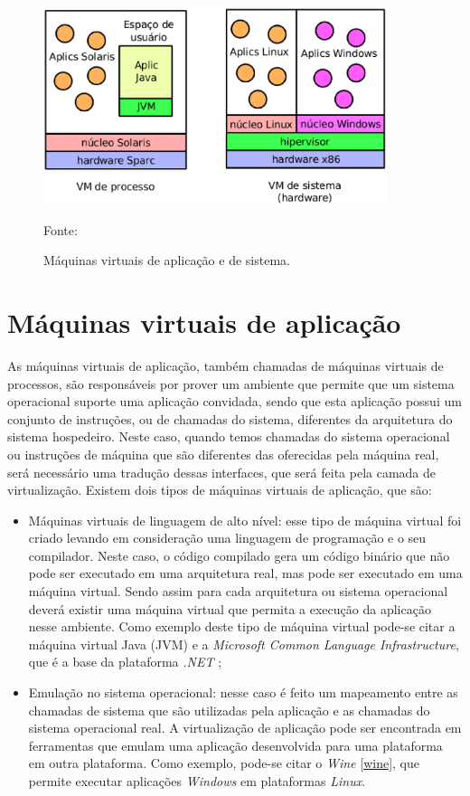\begin{figure}[vms_tipos]
 \centering
 \includegraphics[width=380px]{img/vms_tipos.eps}
 \caption{Máquinas virtuais de aplicação e de sistema.}
 \label{fig:vms_tipos}
 Fonte: \citet{laureano2008}
\end{figure}

\section{Máquinas virtuais de aplicação}
\label{section:virtaplicacao}

As máquinas virtuais de aplicação, também chamadas de máquinas virtuais de processos, são responsáveis por prover um ambiente que permite 
que um sistema operacional suporte uma aplicação convidada, sendo que esta aplicação possui um conjunto de instruções, ou de chamadas
do sistema, diferentes da arquitetura do sistema hospedeiro. Neste caso, quando temos chamadas do sistema operacional ou instruções de máquina 
que são diferentes das oferecidas pela máquina real, será necessário uma tradução dessas interfaces, que será feita pela camada de 
virtualização. Existem dois tipos de máquinas virtuais de aplicação, que são:

\begin{itemize}
 \item Máquinas virtuais de linguagem de alto nível: esse tipo de máquina virtual foi criado levando em consideração uma linguagem de 
 programação e o seu compilador. Neste caso, o código compilado gera um código binário que não pode ser executado em uma arquitetura real, 
 mas pode ser executado em uma máquina virtual. Sendo assim para cada arquitetura ou sistema operacional deverá existir uma máquina virtual que
 permita a execução da aplicação nesse ambiente. Como exemplo deste tipo de máquina virtual pode-se citar a máquina virtual Java (\ac{JVM})
 e a \textit{Microsoft Common Language Infrastructure}, que é a base da plataforma \textit{.NET} \cite{carissimi2008};
 \item Emulação no sistema operacional: nesse caso é feito um mapeamento entre as chamadas de sistema que são utilizadas pela aplicação 
 e as chamadas do sistema operacional real. A virtualização de aplicação pode ser encontrada em ferramentas que emulam uma aplicação 
 desenvolvida para uma plataforma em outra plataforma. Como exemplo, pode-se citar o \textit{Wine} \ref{wine}, que permite executar aplicações 
 \textit{Windows} em plataformas \textit{Linux}.
\end{itemize}

